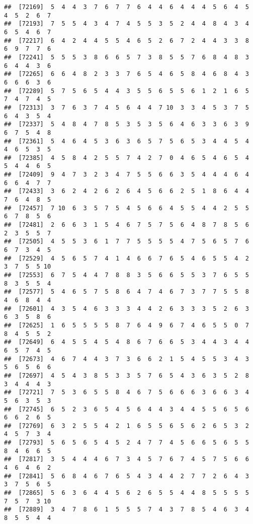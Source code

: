 \documentclass[
]{book}
\begin{document}
\begin{verbatim}
##  [72169]  5  4  4  3  7  6  7  7  6  4  4  6  4  4  4  5  6  4  5  4  5  2  6  7
##  [72193]  7  5  5  4  3  4  7  4  5  5  3  5  2  4  4  8  4  3  4  6  5  4  6  7
##  [72217]  6  4  2  4  4  5  5  4  6  5  2  6  7  2  4  4  3  3  8  6  9  7  7  6
##  [72241]  5  5  5  3  8  6  6  5  7  3  8  5  5  7  6  8  4  8  3  6  4  4  3  6
##  [72265]  6  6  4  8  2  3  3  7  6  5  4  6  5  8  4  6  8  4  3  6  6  6  3  6
##  [72289]  5  7  5  6  5  4  4  3  5  5  6  5  5  6  1  2  1  6  5  7  4  7  4  5
##  [72313]  3  7  6  3  7  4  5  6  4  4  7 10  3  3  4  5  3  7  5  6  4  3  5  4
##  [72337]  5  4  8  4  7  8  5  3  5  3  5  6  4  6  3  3  6  3  9  6  7  5  4  8
##  [72361]  5  4  6  4  5  3  6  3  6  5  7  5  6  5  3  4  4  5  4  4  6  5  3  5
##  [72385]  4  5  8  4  2  5  5  7  4  2  7  0  4  6  5  4  6  5  4  5  4  4  6  5
##  [72409]  9  4  7  3  2  3  4  7  5  5  6  6  3  5  4  4  4  6  4  6  6  4  7  7
##  [72433]  3  6  2  4  2  6  2  6  4  5  6  6  2  5  1  8  6  4  4  7  6  4  8  5
##  [72457]  7 10  6  3  5  7  5  4  5  6  6  4  5  5  4  4  2  5  5  6  7  8  5  6
##  [72481]  2  6  6  3  1  5  4  6  7  5  7  5  6  4  8  7  8  5  6  2  3  5  5  7
##  [72505]  4  5  5  3  6  1  7  7  5  5  5  5  4  7  5  6  5  7  6  6  7  3  4  5
##  [72529]  4  5  6  5  7  4  1  4  6  6  7  6  5  4  6  5  5  4  2  3  7  5  5 10
##  [72553]  6  7  5  4  4  7  8  8  3  5  6  6  5  5  3  7  6  5  5  8  3  5  5  4
##  [72577]  5  4  6  5  7  5  8  6  4  7  4  6  7  3  7  7  5  5  8  4  6  8  4  4
##  [72601]  4  3  5  4  6  3  3  3  4  4  2  6  3  3  3  5  2  6  3  6  3  5  8  6
##  [72625]  1  6  5  5  5  5  8  7  6  4  9  6  7  4  6  5  5  0  7  8  4  5  5  2
##  [72649]  6  4  5  5  4  5  4  8  6  7  6  6  5  3  4  4  3  4  4  6  5  7  4  5
##  [72673]  4  6  7  4  4  3  7  3  6  6  2  1  5  4  5  5  3  4  3  5  6  5  6  6
##  [72697]  4  5  4  3  8  5  3  3  5  7  6  5  4  3  6  3  5  2  8  3  4  4  4  3
##  [72721]  7  5  3  6  5  5  8  4  6  7  5  6  6  6  3  6  6  3  4  5  6  3  5  3
##  [72745]  6  5  2  3  6  5  4  5  6  4  4  3  4  4  5  5  6  5  6  6  6  2  6  5
##  [72769]  6  3  2  5  5  4  2  1  6  5  5  6  5  6  2  6  5  3  2  4  5  7  3  4
##  [72793]  5  6  5  6  5  4  5  2  4  7  7  4  5  6  6  5  6  5  5  8  4  6  6  5
##  [72817]  3  5  4  4  4  6  7  3  4  5  7  6  7  4  5  7  5  6  6  4  6  4  6  2
##  [72841]  5  6  8  4  6  7  6  5  4  3  4  4  2  7  7  2  6  4  3  3  7  5  6  5
##  [72865]  5  6  3  6  4  4  5  6  2  6  5  5  4  4  8  5  5  5  5  7  5  7  3 10
##  [72889]  3  4  7  8  6  1  5  5  5  7  4  3  7  8  5  4  6  3  4  8  5  5  4  4

\end{verbatim}
\end{document}
